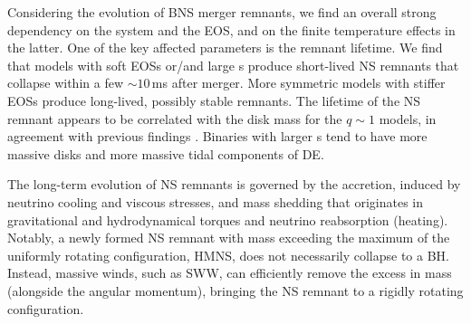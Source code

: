 
Considering the \pmerg{} evolution of \ac{BNS} merger remnants, we find an
overall strong dependency on the system \mr{} and the \ac{EOS}, and on the 
finite temperature effects in the latter. One of the key affected 
parameters is the remnant lifetime. We find that models with 
soft \acp{EOS} or/and large \mr{}s produce short-lived \ac{NS} remnants that 
collapse within a few ${\sim}10\,$ms after merger. 
%
More symmetric models with stiffer \acp{EOS} produce long-lived, possibly 
stable remnants. The lifetime of the \ac{NS} remnant appears to be correlated with the 
disk mass for the $q\sim 1$ models, in agreement with previous findings 
\citep{Radice:2017lry,Radice:2018pdn}.
Binaries with larger \mr{}s tend to have more massive disks and more massive tidal 
components of \ac{DE}.
%

The long-term evolution of \pmerg{} \ac{NS} remnants is governed by the accretion, 
induced by neutrino cooling and viscous stresses, and mass shedding that originates 
in gravitational and hydrodynamical torques and neutrino reabsorption (heating). 
Notably, a newly formed \ac{NS} remnant with mass exceeding the 
maximum of the uniformly rotating configuration, \ac{HMNS}, does not necessarily collapse 
to a \ac{BH}. Instead, massive winds, such as \ac{SWW}, can efficiently remove the 
excess in mass (alongside the angular momentum), bringing the \ac{NS} remnant 
to a rigidly rotating configuration.
%

